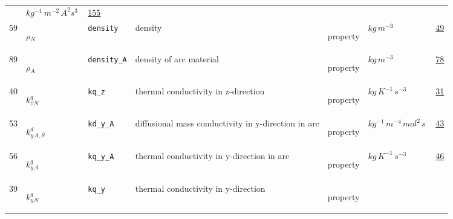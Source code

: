 \begin{longtable}{|p{1cm}|p{2.5cm}|p{4.5cm}|p{8cm}|p{3.0cm}|p{3cm}|p{1cm}|}
             & $ kg^{-1} \,m^{-2} \,A^{2} s^{3} \, $
             &                 \hyperlink{"e:155"}{ 155 }
                 \\
            59
             & \hypertarget{"v:59"}{ $ {\rho}{_{N}} $}
             & \verb|density|
             & density
             & \begin{lay}property \end{lay}
             & $ kg \,m^{-3} \, $
             &                 \hyperlink{"e:49"}{ 49 }
                 \\
            89
             & \hypertarget{"v:89"}{ $ {\rho}{_{A}} $}
             & \verb|density_A|
             & density of arc material
             & \begin{lay}property \end{lay}
             & $ kg \,m^{-3} \, $
             &                 \hyperlink{"e:78"}{ 78 }
                 \\
            40
             & \hypertarget{"v:40"}{ $ {{k^q_z}}{_{N}} $}
             & \verb|kq_z|
             & thermal conductivity in z-direction
             & \begin{lay}property \end{lay}
             & $ kg \,K^{-1} \,s^{-3} \, $
             &                 \hyperlink{"e:31"}{ 31 }
                 \\
            53
             & \hypertarget{"v:53"}{ $ {{k^d_y}}{_{A, S}} $}
             & \verb|kd_y_A|
             & diffusional mass conductivity in y-direction in arc
             & \begin{lay}property \end{lay}
             & $ kg^{-1} \,m^{-4} \,mol^{2} \,s \, $
             &                 \hyperlink{"e:43"}{ 43 }
                 \\
            56
             & \hypertarget{"v:56"}{ $ {{k^q_y}}{_{A}} $}
             & \verb|kq_y_A|
             & thermal conductivity in y-direction in arc
             & \begin{lay}property \end{lay}
             & $ kg \,K^{-1} \,s^{-3} \, $
             &                 \hyperlink{"e:46"}{ 46 }
                 \\
            39
             & \hypertarget{"v:39"}{ $ {{k^q_y}}{_{N}} $}
             & \verb|kq_y|
             & thermal conductivity in y-direction
             & \begin{lay}property \end{lay}

\end{longtable}
